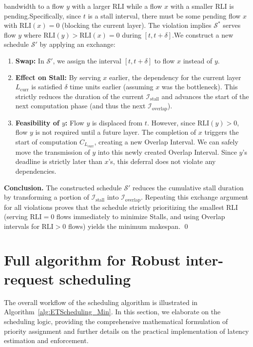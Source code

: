 bandwidth to a flow $y$ with a larger RLI while a flow $x$ with a smaller RLI is pending.Specifically, since $t$ is a stall interval, there must be some pending flow $x$ with $\text{RLI}(x) = 0$ (blocking the current layer). The violation implies $\mathcal{S}^*$ serves flow $y$ where $\text{RLI}(y) > \text{RLI}(x) = 0$ during $[t, t+\delta]$.We construct a new schedule $\mathcal{S}'$ by applying an exchange:\begin{enumerate}\item \textbf{Swap:} In $\mathcal{S}'$, we assign the interval $[t, t+\delta]$ to flow $x$ instead of $y$.\item \textbf{Effect on Stall:} By serving $x$ earlier, the dependency for the current layer $L_{\text{curr}}$ is satisfied $\delta$ time units earlier (assuming $x$ was the bottleneck). This strictly reduces the duration of the current $\mathcal{I}_{\text{stall}}$ and advances the start of the next computation phase (and thus the next $\mathcal{I}_{\text{overlap}}$).\item \textbf{Feasibility of $y$:} Flow $y$ is displaced from $t$. However, since $\text{RLI}(y) > 0$, flow $y$ is not required until a future layer. The completion of $x$ triggers the start of computation $C_{L_{\text{curr}}}$, creating a new Overlap Interval. We can safely move the transmission of $y$ into this newly created Overlap Interval. Since $y$'s deadline is strictly later than $x$'s, this deferral does not violate any dependencies.\end{enumerate}\textbf{Conclusion.} The constructed schedule $\mathcal{S}'$ reduces the cumulative stall duration by transforming a portion of $\mathcal{I}_{\text{stall}}$ into $\mathcal{I}_{\text{overlap}}$. Repeating this exchange argument for all violations proves that the schedule strictly prioritizing the smallest RLI (serving $\text{RLI}=0$ flows immediately to minimize Stalls, and using Overlap intervals for $\text{RLI}>0$ flows) yields the minimum makespan. \qed

\section{Full algorithm for Robust inter-request scheduling} \label{sec:appendix:fullalg}



The overall workflow of the scheduling algorithm is illustrated in Algorithm~\ref{alg:ETScheduling_Min}. In this section, we elaborate on the scheduling logic, providing the comprehensive mathematical formulation of priority assignment and further details on the practical implementation of latency estimation and enforcement.

